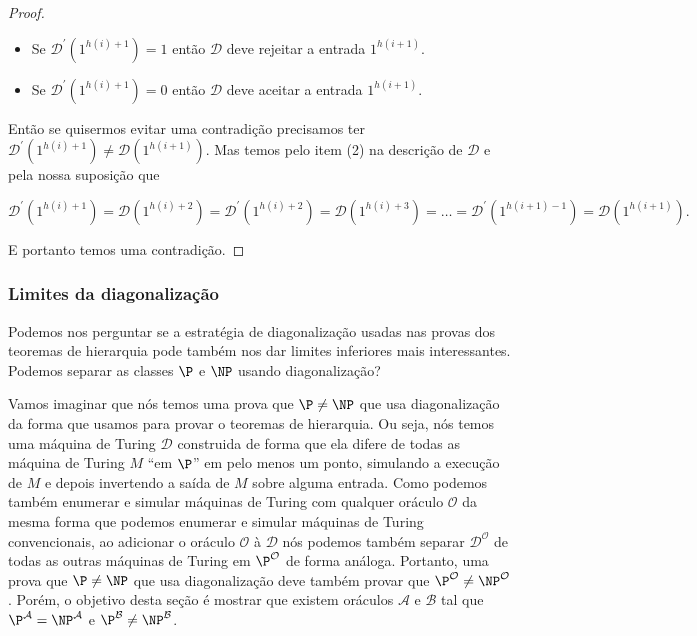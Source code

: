 \begin{proof}
\begin{itemize}
    \item Se $\mathcal{D}^{\prime}(1^{h(i) + 1}) = 1$ então $\mathcal{D}$ deve rejeitar a entrada $1^{h(i + 1)}$.
    
    \item Se $\mathcal{D}^{\prime}(1^{h(i) + 1}) = 0$ então $\mathcal{D}$ deve aceitar a entrada $1^{h(i + 1)}$.

\end{itemize}

Então se quisermos evitar uma contradição precisamos ter $\mathcal{D}^{\prime}(1^{h(i) + 1}) \neq \mathcal{D}(1^{h(i + 1)})$. Mas temos pelo item (2) na descrição de $\mathcal{D}$ e pela nossa suposição que

\begin{equation*}
    \mathcal{D}^{\prime}(1^{h(i) + 1}) = \mathcal{D}(1^{h(i) + 2}) = \mathcal{D}^{\prime}(1^{h(i) + 2}) = \mathcal{D}(1^{h(i) + 3}) = \dots = \mathcal{D}^{\prime}(1^{h(i + 1) - 1}) = \mathcal{D}(1^{h(i + 1)}).
\end{equation*}

E portanto temos uma contradição.

\end{proof}

\subsubsection{Limites da diagonalização}

Podemos nos perguntar se a estratégia de diagonalização usadas nas provas dos teoremas de hierarquia pode também nos dar limites inferiores mais interessantes. Podemos separar as classes $\P$ e $\NP$ usando diagonalização?

Vamos imaginar que nós temos uma prova que $\P \neq \NP$ que usa diagonalização da forma que usamos para provar o teoremas de hierarquia. Ou seja, nós temos uma máquina de Turing $\mathcal{D}$ construida de forma que ela difere de todas as máquina de Turing $M$ ``em $\P$'' em pelo menos um ponto, simulando a execução de $M$ e depois invertendo a saída de $M$ sobre alguma entrada. Como podemos também enumerar e simular máquinas de Turing com qualquer oráculo $\mathcal{O}$ da mesma forma que podemos enumerar e simular máquinas de Turing convencionais, ao adicionar o oráculo $\mathcal{O}$ à $\mathcal{D}$ nós podemos também separar $\mathcal{D}^{\mathcal{O}}$ de todas as outras máquinas de Turing em $\P^{\mathcal{O}}$ de forma análoga. Portanto, uma prova que $\P \neq \NP$ que usa diagonalização deve também provar que $\P^{\mathcal{O}} \neq \NP^{\mathcal{O}}$. Porém, o objetivo desta seção é mostrar que existem oráculos $\mathcal{A}$ e $\mathcal{B}$ tal que $\P^{\mathcal{A}} = \NP^{\mathcal{A}}$ e $\P^{\mathcal{B}} \neq \NP^{\mathcal{B}}$.

